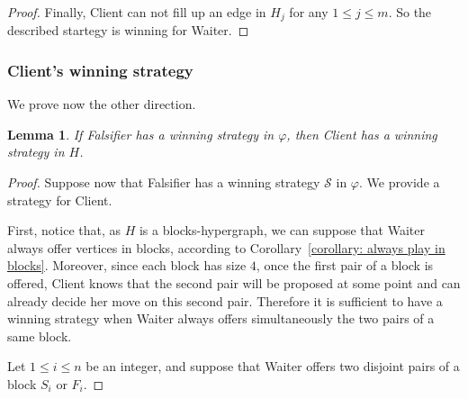 \documentclass{article}
\newcommand{\strat}{\mathcal{S}}
\newcommand{\hyp}{H}
\newcommand{\hedge}{edge\xspace}
\newtheorem{lemma}[theorem]{Lemma}
\begin{document}
\begin{proof}
Finally, Client can not fill up an \hedge in $H_j$ for any $1 \le j \le m$. So the described startegy is winning for Waiter.
\end{proof}

\subsubsection{Client's winning strategy} \label{subsection client}

We prove now the other direction.

\begin{lemma}\label{falsifier implies client}
If Falsifier has a winning strategy in $\varphi$, then Client has a winning strategy in $\hyp$.
\end{lemma}

\begin{proof}
Suppose now that Falsifier has a winning strategy $\strat$ in $\varphi$. We provide a strategy for Client. 

First, notice that, as $\hyp$ is a blocks-hypergraph, we can suppose that Waiter always offer vertices in blocks, according to Corollary~\ref{corollary: always play in blocks}. Moreover, since each block has size $4$, once the first pair of a block is offered, Client knows that the second pair will be proposed at some point and can already decide her move on this second pair. Therefore it is sufficient to have a winning strategy when Waiter always offers simultaneously the two pairs of a same block.

Let $1 \le i \le n$ be an integer, and suppose that Waiter offers two disjoint pairs of a block $S_i$ or $F_i$. 


\end{proof}
\end{document}
